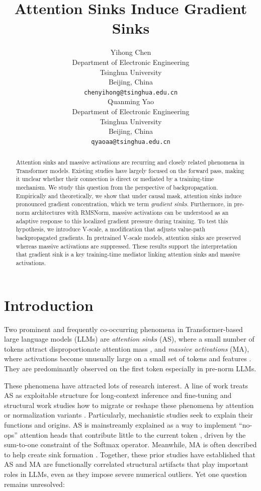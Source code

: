 \documentclass{article}
\title{Attention Sinks Induce Gradient Sinks}
\author{
    Yihong Chen \\
    Department of Electronic Engineering\\
    Tsinghua University\\
    Beijing, China \\
    \texttt{chenyihong@tsinghua.edu.cn} \\
    \And
    Quanming Yao \\
    Department of Electronic Engineering\\
    Tsinghua University\\
    Beijing, China \\
    \texttt{qyaoaa@tsinghua.edu.cn} \\
}
\theoremstyle{plain}
\theoremstyle{definition}
\theoremstyle{remark}
\begin{document}
\maketitle

\begin{abstract}
Attention sinks and massive activations are recurring and closely related phenomena in Transformer models. Existing studies have largely focused on the forward pass, making it unclear whether their connection is direct or mediated by a training-time mechanism. We study this question from the perspective of backpropagation. Empirically and theoretically, we show that under causal mask, attention sinks induce pronounced gradient concentration, which we term \emph{gradient sinks}. Furthermore, in pre-norm architectures with RMSNorm, massive activations can be understood as an adaptive response to this localized gradient pressure during training. To test this hypothesis, we introduce V-scale, a modification that adjusts value-path backpropagated gradients. In pretrained V-scale models, attention sinks are preserved whereas massive activations are suppressed. These results support the interpretation that gradient sink is a key training-time mediator linking attention sinks and massive activations.
\end{abstract}

\section{Introduction}
Two prominent and frequently co-occurring phenomena in Transformer-based large language models (LLMs) are \emph{attention sinks} (AS), where a small number of tokens attract disproportionate attention mass \citep{xiao2024streamingllm,gu2025when}, and \emph{massive activations} (MA), where activations become unusually large on a small set of tokens and features \citep{bondarenko2023quantizable,sun2024massive,an2025systematic}. They are predominantly observed on the first token especially in pre-norm LLMs.

These phenomena have attracted lots of research interest. 
A line of work treats AS as exploitable structure for long-context inference and fine-tuning \citep{xiao2024streamingllm,su2025kvsink,liu2026sinktrack,liu2025all,fu2026attention,liu2026surgery} and structural work studies how to migrate or reshape these phenomena by attention or normalization variants \citep{henry2020qknorm,miller2023attention,kaul2025from,zuhri2025softpick,qiu2025gated,bu2025valuestategated,sun2026spike}. 
Particularly, mechanistic studies seek to explain their functions and origins. AS is mainstreamly explained as a way to implement ``no-ops'' attention heads that contribute little to the current token \citep{gu2025when,barbero2025why,guo2025activedormant}, driven by the sum-to-one constraint of the Softmax operator. Meanwhile, MA is often described to help create sink formation \citep{sun2024massive,su2026unveiling,queipo-de-llano2026attention}. 
Together, these prior studies have established that AS and MA are functionally correlated structural artifacts that play important roles in LLMs, even as they impose severe numerical outliers. 
Yet one question remains unresolved:
\end{document}
